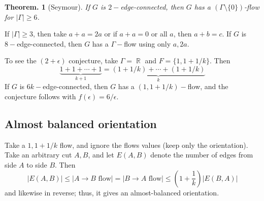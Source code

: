 \documentclass[11pt, a4paper]{memoir}
\DeclareMathOperator{\R}{{\mathbb{R}}}
\theoremstyle{change}
\newtheorem{theorem}{Theorem.}[section]
\theoremstyle{plain}
\theoremstyle{nonumberplain}
\numberwithin{equation}{section}
\begin{document}
\begin{theorem}[Seymour]
    If $G$ is $2-$edge-connected, then $G$ has a $(\Gamma\setminus\{0\})$-flow for $|\Gamma|\geq 6$.
\end{theorem}
If $|\Gamma|\geq 3$, then take $a+a=2a$ or if $a+a=0$ or all $a$, then $a+b=c$.
If $G$ is $8-$edge-connected, then $G$ has a $\Gamma-$flow using only $a,2a$.

To see the $(2+\epsilon)$ conjecture, take $\Gamma=\R$ and $F=\{1,1+1/k\}$.
Then
\begin{equation*}
    \underbrace{1+1+\cdots+1}_{k+1} = \underbrace{(1+1/k)+\cdots+(1+1/k)}_k
\end{equation*}
If $G$ is $6k-$edge-connected, then $G$ has a $(1,1+1/k)-$flow, and the conjecture follows with $f(\epsilon)=6/\epsilon$.
\subsection{Almost balanced orientation}
Take a $1,1+1/k$ flow, and ignore the flows values (keep only the orientation).
Take an arbitrary cut $A,B$, and let $E(A,B)$ denote the number of edges from side $A$ to side $B$.
Then
\begin{equation*}
    |E(A,B)|\leq|A\to B\text{ flow}|=|B\to A\text{ flow}|\leq\left(1+\frac{1}{k}\right)|E(B,A)|
\end{equation*}
and likewise in reverse; thus, it gives an almost-balanced orientation.
\end{document}
